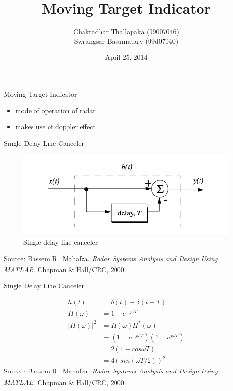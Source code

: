 \documentclass[mathserif]{beamer}
\title{Moving Target Indicator}
\author{Chakradhar Thallapaka (09007046) \\ Swrangsar Basumatary (09d07040) }
\institute{Department of Electrical Engineering \\ IIT Bombay, Powai}
\date{April 25, 2014}
\begin{document}
    \frame{\titlepage}
    
    
\begin{frame}{Moving Target Indicator}
    	\begin{itemize}
		\item mode of operation of radar
		\item makes use of doppler effect
	\end{itemize}
    \end{frame}

    
    \begin{frame}{Single Delay Line Canceler}
      \begin{minipage}[t][0.8\textheight][t]{\textwidth}
	\begin{figure}[h]
		\centering
		\includegraphics[width=\linewidth]{singleDLC} 
		\caption{Single delay line canceler}
	\end{figure}
	\vfill
	\tiny{Source: Bassem R.~Mahafza. \emph{Radar Systems Analysis and Design Using MATLAB\textsuperscript{\textregistered}}. Chapman \& Hall/CRC, 2000.} 
      \end{minipage}
    \end{frame}
    

    \begin{frame}{Single Delay Line Canceler}
      \begin{minipage}[t][0.8\textheight][t]{\textwidth}
   	\begin{align}
    	 h(t) & = \delta(t) - \delta(t-T) \nonumber \\
    	 H(\omega) & = 1 - e^{-j\omega T} \nonumber \\
    	 |H(\omega)|^2 & = H(\omega)H^*(\omega) \nonumber \\
    	 & = (1 - e^{-j\omega T})(1 - e^{j\omega T}) \nonumber \\
    	 & = 2(1-cos\omega T) \nonumber \\
    	 & = 4(sin(\omega T/2))^2 \nonumber
    	\end{align}
	\vfill
   	\tiny{Source: Bassem R.~Mahafza. \emph{Radar Systems Analysis and Design Using MATLAB\textsuperscript{\textregistered}}. Chapman \& Hall/CRC, 2000.}
      \end{minipage}
    \end{frame}
    
\end{document}
